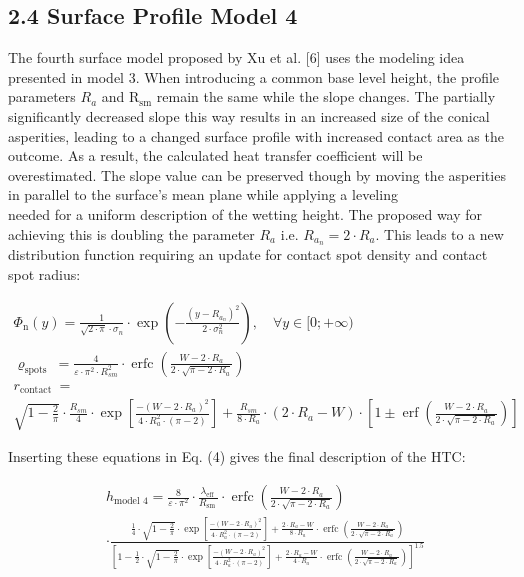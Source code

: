 \documentclass[10pt]{article}
\begin{document}
\subsection*{2.4 Surface Profile Model 4}
The fourth surface model proposed by $\mathrm{Xu}$ et al. [6] uses the modeling idea presented in model 3. When introducing a common base level height, the profile parameters $R_{a}$ and $\mathrm{R}_{\mathrm{sm}}$ remain the same while the slope changes. The partially significantly decreased slope this way results in an increased size of the conical asperities, leading to a changed surface profile with increased contact area as the outcome. As a result, the calculated heat transfer coefficient will be overestimated. The slope value can be preserved though by moving the asperities in parallel to the surface's mean plane while applying a leveling\\
needed for a uniform description of the wetting height. The proposed way for achieving this is doubling the parameter $R_{a}$ i.e. $R_{a_{n}}=2 \cdot R_{a}$. This leads to a new distribution function requiring an update for contact spot density and contact spot radius:


\begin{gather*}
\Phi_{\mathrm{n}}(y)=\frac{1}{\sqrt{2 \cdot \pi} \cdot \sigma_{n}} \cdot \exp \left(-\frac{\left(y-R_{a_{n}}\right)^{2}}{2 \cdot \sigma_{n}^{2}}\right), \quad \forall y \in[0 ;+\infty)  \tag{14}\\
\varrho_{\text {spots }}=\frac{4}{\varepsilon \cdot \pi^{2} \cdot R_{s m}^{2}} \cdot \operatorname{erfc}\left(\frac{W-2 \cdot R_{a}}{2 \cdot \sqrt{\pi-2 \cdot R_{a}}}\right)  \tag{15}\\
r_{\text {contact }}= \\
\sqrt{1-\frac{2}{\pi}} \cdot \frac{R_{s m}}{4} \cdot \exp \left[\frac{-\left(W-2 \cdot R_{a}\right)^{2}}{4 \cdot R_{a}^{2} \cdot(\pi-2)}\right]+\frac{R_{s m}}{8 \cdot R_{a}} \cdot\left(2 \cdot R_{a}-W\right) \cdot\left[1 \pm \operatorname{erf}\left(\frac{W-2 \cdot R_{a}}{2 \cdot \sqrt{\pi-2 \cdot R_{a}}}\right)\right] \tag{16}
\end{gather*}


Inserting these equations in Eq. (4) gives the final description of the HTC:


\begin{align*}
& h_{\text {model } 4}=\frac{8}{\varepsilon \cdot \pi^{2}} \cdot \frac{\lambda_{\text {eff }}}{R_{\text {sm }}} \cdot \operatorname{erfc}\left(\frac{W-2 \cdot R_{a}}{2 \cdot \sqrt{\pi-2 \cdot R_{a}}}\right) \\
& \cdot \frac{\frac{1}{4} \cdot \sqrt{1-\frac{2}{\pi}} \cdot \exp \left[\frac{-\left(W-2 \cdot R_{a}\right)^{2}}{4 \cdot R_{a}^{2} \cdot(\pi-2)}\right]+\frac{2 \cdot R_{a}-W}{8 \cdot R_{a}} \cdot \operatorname{erfc}\left(\frac{W-2 \cdot R_{a}}{2 \cdot \sqrt{\pi-2 \cdot R_{a}}}\right)}{\left[1-\frac{1}{2} \cdot \sqrt{1-\frac{2}{\pi}} \cdot \exp \left[\frac{-\left(W-2 \cdot R_{a}\right)^{2}}{4 \cdot R_{a}^{2} \cdot(\pi-2)}\right]+\frac{2 \cdot R_{a}-W}{4 \cdot R_{a}} \cdot \operatorname{erfc}\left(\frac{W-2 \cdot R_{a}}{2 \cdot \sqrt{\pi-2 \cdot R_{a}}}\right)\right]^{1.5}} \tag{17}
\end{align*}
\end{document}
